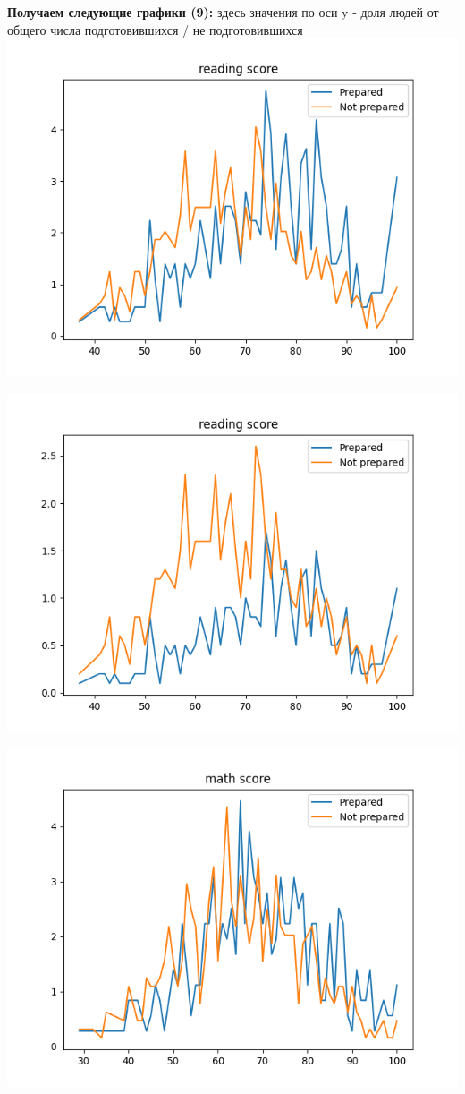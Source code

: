 \documentclass[12pt,a4paper]{article}
\begin{document}
\textbf{Получаем следующие графики (9):} здесь значения по оси y - доля людей от общего числа подготовившихся / не подготовившихся \\
\includegraphics[scale=1]{prep_writing_score.png} 

\includegraphics[scale=1]{prep_reading_score.png} 

\includegraphics[scale=1]{prep_math_score.png}
\end{document}
